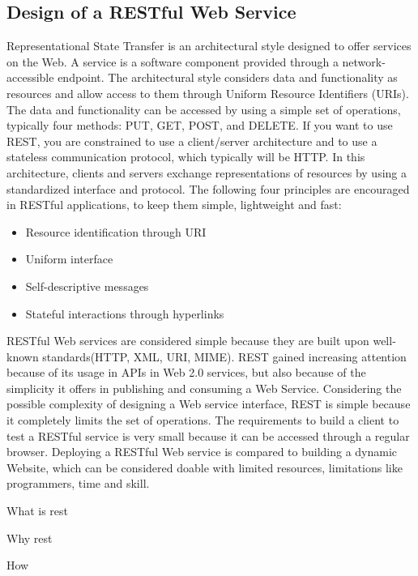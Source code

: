 \subsection{Design of a RESTful Web Service}
\label{subsec:restDes}
Representational State Transfer is an architectural style designed to offer services on the Web. A service is a software component provided through a network-accessible endpoint. The architectural style considers data and functionality as resources and allow access to them through Uniform Resource Identifiers (URIs). The data and functionality can be accessed by using a simple set of operations, typically four methods: PUT, GET, POST, and DELETE. If you want to use REST, you are constrained to use a client/server architecture and to use a stateless communication protocol, which typically will be HTTP. In this architecture, clients and servers exchange representations of resources by using a standardized interface and protocol. The following four principles are encouraged in RESTful applications, to keep them simple, lightweight and fast\cite{WhatAreRESTful}\cite{choosingRESTful}:
\begin{itemize}
\item Resource identification through URI
\item Uniform interface
\item Self-descriptive messages
\item Stateful interactions through hyperlinks
\end{itemize}

RESTful Web services are considered simple because they are built upon well-known standards(HTTP, XML, URI, MIME). REST gained increasing attention because of its usage in APIs in Web 2.0 services, but also because of the simplicity it offers in publishing and consuming a Web Service. Considering the possible complexity of designing a Web service interface, REST is simple because it completely limits the set of operations. The requirements to build a client to test a RESTful service is very small because it can be accessed through a regular browser. Deploying a RESTful Web service is compared to building a dynamic Website, which can be considered doable with limited resources, limitations like programmers, time and skill. 



What is rest

Why rest

How